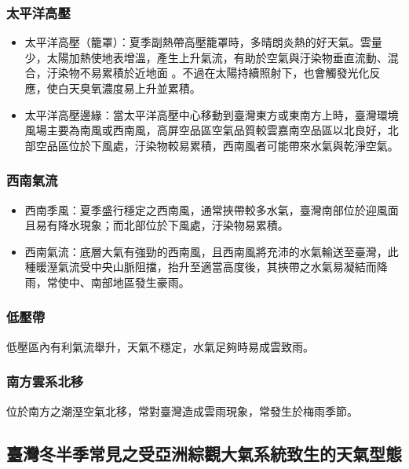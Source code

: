 \documentclass[a4paper,12pt]{report}
\begin{document}
\begin{itemize}
\subsubsection{太平洋高壓}
\begin{itemize}
  \item 太平洋高壓（籠罩）：夏季副熱帶高壓籠罩時，多晴朗炎熱的好天氣。雲量少，太陽加熱使地表增溫，產生上升氣流，有助於空氣與汙染物垂直流動、混合，汙染物不易累積於近地面 。不過在太陽持續照射下，也會觸發光化反應，使白天臭氧濃度易上升並累積。
  \item 太平洋高壓邊緣：當太平洋高壓中心移動到臺灣東方或東南方上時，臺灣環境風場主要為南風或西南風，高屏空品區空氣品質較雲嘉南空品區以北良好，北部空品區位於下風處，汙染物較易累積，西南風者可能帶來水氣與乾淨空氣。
\end{itemize}
\subsubsection{西南氣流}
\begin{itemize}
  \item 西南季風：夏季盛行穩定之西南風，通常挾帶較多水氣，臺灣南部位於迎風面且易有降水現象；而北部位於下風處，汙染物易累積。
  \item 西南氣流：底層大氣有強勁的西南風，且西南風將充沛的水氣輸送至臺灣，此種暖溼氣流受中央山脈阻擋，抬升至適當高度後，其挾帶之水氣易凝結而降雨，常使中、南部地區發生豪雨。
\end{itemize}
\subsubsection{低壓帶}
低壓區內有利氣流舉升，天氣不穩定，水氣足夠時易成雲致雨。
\subsubsection{南方雲系北移}
位於南方之潮溼空氣北移，常對臺灣造成雲雨現象，常發生於梅雨季節。
\subsection{臺灣冬半季常見之受亞洲綜觀大氣系統致生的天氣型態}

\end{itemize}
\end{document}
